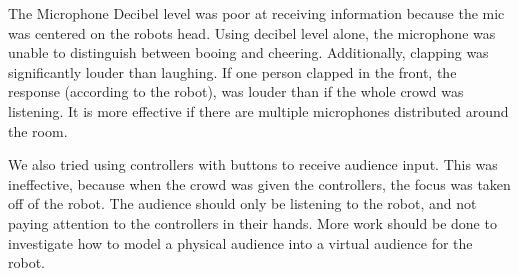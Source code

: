     The Microphone Decibel level was poor at receiving information because the mic was centered on the robots head.
    Using decibel level alone, the microphone was unable to distinguish between booing and cheering.
    Additionally, clapping was significantly louder than laughing. 
    If one person clapped in the front, the response (according to the robot), was louder than if the whole crowd was listening.
    It is more effective if there are multiple microphones distributed around the room.


    We also tried using controllers with buttons to receive audience input.
    This was ineffective, because when the crowd was given the controllers, the focus was taken off of the robot.
    The audience should only be listening to the robot, and not paying attention to the controllers in their hands.
    More work should be done to investigate how to model a physical audience into a virtual audience for the robot.
